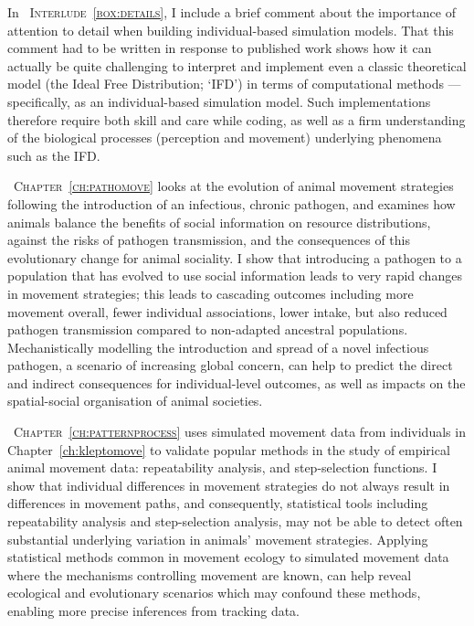 \medskip

\noindent In {\scshape~Interlude~\ref{box:details}}, I include a brief comment about the importance of attention to detail when building individual-based simulation models.
That this comment had to be written in response to published work shows how it can actually be quite challenging to interpret and implement even a classic theoretical model (the Ideal Free Distribution; `IFD') in terms of computational methods --- specifically, as an individual-based simulation model.
Such implementations therefore require both skill and care while coding, as well as a firm understanding of the biological processes (perception and movement) underlying phenomena such as the IFD.

\medskip

{\scshape~Chapter~\ref{ch:pathomove}} looks at the evolution of animal movement strategies following the introduction of an infectious, chronic pathogen, and examines how animals balance the benefits of social information on resource distributions, against the risks of pathogen transmission, and the consequences of this evolutionary change for animal sociality.
I show that introducing a pathogen to a population that has evolved to use social information leads to very rapid changes in movement strategies; this leads to cascading outcomes including more movement overall, fewer individual associations, lower intake, but also reduced pathogen transmission compared to non-adapted ancestral populations.
Mechanistically modelling the introduction and spread of a novel infectious pathogen, a scenario of increasing global concern, can help to predict the direct and indirect consequences for individual-level outcomes, as well as impacts on the spatial-social organisation of animal societies.

\medskip

{\scshape~Chapter~\ref{ch:patternprocess}} uses simulated movement data from individuals in Chapter~\ref{ch:kleptomove} to validate popular methods in the study of empirical animal movement data: repeatability analysis, and step-selection functions.
I show that individual differences in movement strategies do not always result in differences in movement paths, and consequently, statistical tools including repeatability analysis and step-selection analysis, may not be able to detect often substantial underlying variation in animals' movement strategies.
Applying statistical methods common in movement ecology to simulated movement data where the mechanisms controlling movement are known, can help reveal ecological and evolutionary scenarios which may confound these methods, enabling more precise inferences from tracking data.

